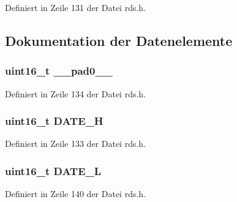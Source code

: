 Definiert in Zeile 131 der Datei rds.\+h.



\subsection{Dokumentation der Datenelemente}
\hypertarget{structgroup__4a_a77132c2c26a75f5b8751b235cda23828}{}
\subsubsection[{\+\_\+\+\_\+pad0\+\_\+\+\_\+}]{\setlength{\rightskip}{0pt plus 5cm}uint16\+\_\+t \+\_\+\+\_\+pad0\+\_\+\+\_\+}\label{structgroup__4a_a77132c2c26a75f5b8751b235cda23828}


Definiert in Zeile 134 der Datei rds.\+h.

\hypertarget{structgroup__4a_a3e79884699012bd2127da5d0d474072b}{}
\subsubsection[{D\+A\+T\+E\+\_\+\+H}]{\setlength{\rightskip}{0pt plus 5cm}uint16\+\_\+t D\+A\+T\+E\+\_\+\+H}\label{structgroup__4a_a3e79884699012bd2127da5d0d474072b}


Definiert in Zeile 133 der Datei rds.\+h.

\hypertarget{structgroup__4a_a41f1477fa1205c5f2c4135c43419f931}{}
\subsubsection[{D\+A\+T\+E\+\_\+\+L}]{\setlength{\rightskip}{0pt plus 5cm}uint16\+\_\+t D\+A\+T\+E\+\_\+\+L}\label{structgroup__4a_a41f1477fa1205c5f2c4135c43419f931}


Definiert in Zeile 140 der Datei rds.\+h.

\hypertarget{structgroup__4a_a66d4119990dc4c3e040a43885e9bb953}{}
